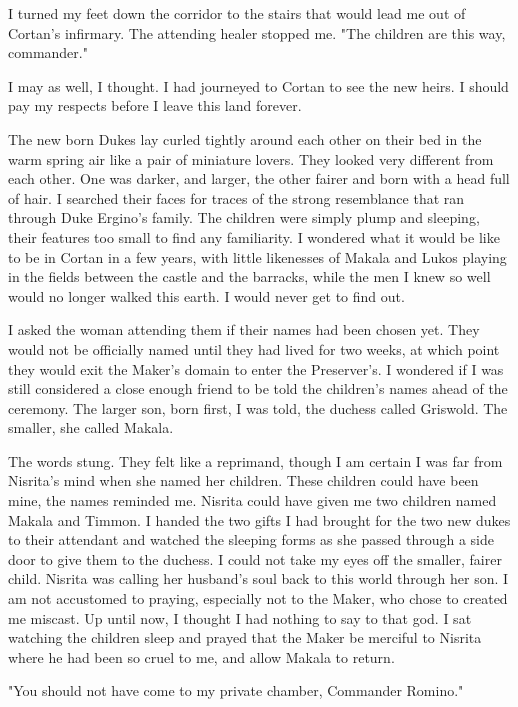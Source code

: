 \documentclass{article}
\begin{document}
I turned my feet down the corridor to the stairs that would lead me out of Cortan's infirmary. The attending healer stopped me. "The children are this way, commander."

I may as well, I thought. I had journeyed to Cortan to see the new heirs. I should pay my respects before I leave this land forever. 

The new born Dukes lay curled tightly around each other on their bed in the warm spring air like a pair of miniature lovers. They looked very different from each other. One was darker, and larger, the other fairer and born with a head full of hair. I searched their faces for traces of the strong resemblance that ran through Duke Ergino's family. The children were simply plump and sleeping, their features too small to find any familiarity. I wondered what it would be like to be in Cortan in a few years, with little likenesses of Makala and Lukos playing in the fields between the castle and the barracks, while the men I knew so well would no longer walked this earth. I would never get to find out.

I asked the woman attending them if their names had been chosen yet. They would not be officially named until they had lived for two weeks, at which point they would exit the Maker's domain to enter the Preserver's. I wondered if I was still considered a close enough friend to be told the children's names ahead of the ceremony. The larger son, born first, I was told, the duchess called Griswold. The smaller, she called Makala.

The words stung. They felt like a reprimand, though I am certain I was far from Nisrita's mind when she named her children. These children could have been mine, the names reminded me. Nisrita could have given me two children named Makala and Timmon. I handed the two gifts I had brought for the two new dukes to their attendant and watched the sleeping forms as she passed through a side door to give them to the duchess. I could not take my eyes off the smaller, fairer child. Nisrita was calling her husband's soul back to this world through her son. I am not accustomed to praying, especially not to the Maker, who chose to created me miscast. Up until now, I thought I had nothing to say to that god. I sat watching the children sleep and prayed that the Maker be merciful to Nisrita where he had been so cruel to me, and allow Makala to return. 

"You should not have come to my private chamber, Commander Romino." 
\end{document}
